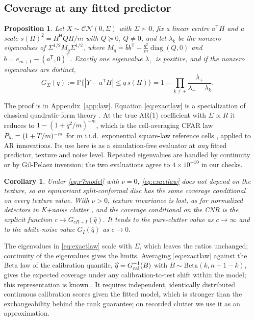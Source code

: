 \documentclass[journal]{IEEEtran}
\newtheorem{proposition}{Proposition}
\newtheorem{corollary}{Corollary}
\newcommand{\PP}{\mathbb{P}}
\begin{document}
\subsection{Coverage at any fitted predictor}
\begin{proposition}\label{prop:law}
Let $X\sim\mathcal{CN}(0,\Sigma)$ with $\Sigma\succ0$, fix a linear centre $a^{\mathsf T}H$ and a scale $s(H)^2=H^{\mathsf H}QH/m$ with $Q\succeq0$, $Q\ne0$, and let $\lambda_k$ be the nonzero eigenvalues of $\Sigma^{1/2}M_q\Sigma^{1/2}$, where $M_q=\bar bb^{\mathsf T}-\frac{q^2}{m}\operatorname{diag}(Q,0)$ and $b=e_{m+1}-(a^{\mathsf T},0)^{\mathsf T}$. Exactly one eigenvalue $\lambda_+$ is positive, and if the nonzero eigenvalues are distinct,
\begin{equation}
G_\Sigma(q):=\PP\{|Y-a^{\mathsf T}H|\le q\,s(H)\}=1-\prod_{k\ne+}\frac{\lambda_+}{\lambda_+-\lambda_k}.
\label{eq:exactlaw}
\end{equation}
\end{proposition}
The proof is in Appendix~\ref{app:law}. Equation \eqref{eq:exactlaw} is a specialization of classical quadratic-form theory \cite{imhof1961,alnaffouri2016}. At the true AR(1) coefficient with $\Sigma\propto R$ it reduces to $1-(1+q^2/m)^{-m}$, which is the cell-averaging CFAR law $P_{\rm fa}=(1+T/m)^{-m}$ for $m$ i.i.d.\ exponential square-law reference cells \cite{finn1968,gandhi1988}, applied to AR innovations. Its use here is as a simulation-free evaluator at \emph{any} fitted predictor, texture and noise level. Repeated eigenvalues are handled by continuity or by Gil-Pelaez inversion; the two evaluations agree to $4\times10^{-10}$ in our checks.

\begin{corollary}\label{cor:texture}
Under \eqref{eq:r7model} with $\nu=0$, \eqref{eq:exactlaw} does not depend on the texture, so an equivariant split-conformal disc has the same coverage conditional on every texture value. With $\nu>0$, texture invariance is lost, as for normalized detectors in K+noise clutter \cite{gini1997,watts1987,sangston2012}, and the coverage conditional on the CNR is the explicit function $c\mapsto G_{cR+I}(\widehat q)$. It tends to the pure-clutter value as $c\to\infty$ and to the white-noise value $G_I(\widehat q)$ as $c\to0$.
\end{corollary}
The eigenvalues in \eqref{eq:exactlaw} scale with $\Sigma$, which leaves the ratios unchanged; continuity of the eigenvalues gives the limits. Averaging \eqref{eq:exactlaw} against the Beta law of the calibration quantile, $\widehat q=G_{\rm cal}^{-1}(B)$ with $B\sim\mathrm{Beta}(k,n+1-k)$, gives the expected coverage under any calibration-to-test shift within the model; this representation is known \cite{vovk2012,ramos2026}. It requires independent, identically distributed continuous calibration scores given the fitted model, which is stronger than the exchangeability behind the rank guarantee; on recorded clutter we use it as an approximation.
\end{document}
